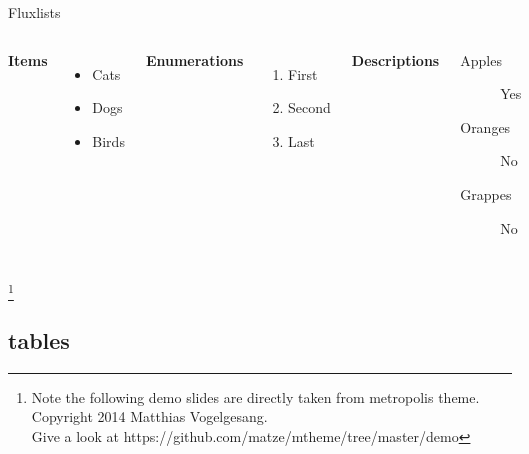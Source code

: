 \documentclass{beamer}
\begin{document}
\begin{frame}{Flux}{lists}
   \begin{columns}[T,onlytextwidth]
      \textbf{Items}
      \begin{itemize}
        \item Cats \item Dogs \item Birds
      \end{itemize}

      \textbf{Enumerations}
      \begin{enumerate}
        \item First \item Second \item Last
      \end{enumerate}

      \textbf{Descriptions}
      \begin{description}
        \item[Apples] Yes \item[Oranges] No \item[Grappes] No
      \end{description}
\end{columns}
\let\thefootnote\relax\footnote{Note the following demo slides are directly taken from metropolis theme. Copyright 2014 Matthias Vogelgesang.\\
Give a look at https://github.com/matze/mtheme/tree/master/demo}
\end{frame}

\subsection{tables}
\end{document}
